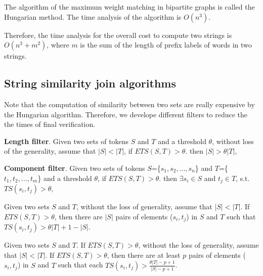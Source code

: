 The algorithm of the maximum weight matching in bipartite graphs is called the Hungarian method. The time analysis of the algorithm is $O(n^3)$.


Therefore, the  time analysis for the overall cost to compute two strings is $O(n^3+m^2)$, where $m$ is the sum of the length of prefix labels of words in two strings.





\subsection{String similarity join algorithms}



Note that the computation of similarity between two sets are really expensive by the Hungarian algorithm. Therefore, we develope different filters to reduce the the times of final verification.
 
\textbf{Length filter}. Given two sets of tokens $S$ and $T$ and a threshold $\theta$, without loss of the generality, assume that $|S| < |T|$,  if $ETS(S,T) > \theta$. then $|S|> \theta |T|$,

\textbf{Component filter}. Given two sets of tokens $S$=\{$s_1,s_2,...,s_n$\} and $T$=\{$t_1,t_2,...,t_m$\} and a threshold $\theta$, if $ETS(S,T) > \theta$. then $\exists s_i \in S$ and $t_j \in T$, s.t. $ TS(s_i, t_j)> \theta $,

\begin{lem} Given two sets $S$ and $T$, without the loss of generality, assume that $|S|<|T|$. If $ETS(S,T) > \theta$,  then there are $|S|$ pairs of elements ($s_i, t_j$) in  $S$ and $T$ such that  $TS(s_i, t_j) > \theta |T| +1 -|S|$.
\end{lem}

\smallskip

\begin{lem} Given two sets $S$ and $T$. If $ETS(S,T) > \theta$, without the loss of generality, assume that $|S|<|T|$. If $ETS(S,T) > \theta$,  then there are at least $p$ pairs of elements ($s_i, t_j$) in  $S$ and $T$ such that each $TS(s_i, t_j) > \frac{\theta |T| - p +1}{|S|-p+1} $.
\end{lem}

\smallskip

